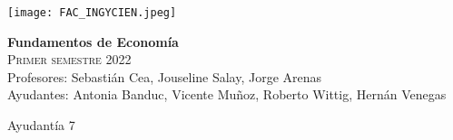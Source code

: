 \documentclass[addpoints,answers]{exam}
\begin{document}


\begin{multicols}{2}

\vspace*{0.24cm}
	\texttt{[image: FAC\_INGYCIEN.jpeg]}
	\begin{center}
		\textbf{Fundamentos de Economía}\\
		\textsc{Primer semestre 2022}\\
		Profesores: Sebastián Cea, Jouseline Salay, Jorge Arenas\\
		Ayudantes: Antonia Banduc, Vicente Muñoz, Roberto Wittig, Hernán Venegas
	\end{center}

\end{multicols}

\begin{center}

\sc Ayudantía 7

\end{center}
\end{document}
